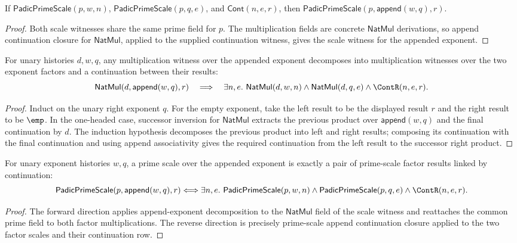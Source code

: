 \begin{theorem}
\label{thm:padic-prime-scale-append-cont-closure}
If \(\mathsf{PadicPrimeScale}(p,w,n)\), \(\mathsf{PadicPrimeScale}(p,q,e)\),
and \(\mathsf{Cont}(n,e,r)\), then
\(\mathsf{PadicPrimeScale}(p,\mathsf{append}(w,q),r)\).
\end{theorem}
\begin{proof}
Both scale witnesses share the same prime field for \(p\). The multiplication
fields are concrete \(\mathsf{NatMul}\) derivations, so append continuation
closure for \(\mathsf{NatMul}\), applied to the supplied continuation witness,
gives the scale witness for the appended exponent.
\end{proof}

\begin{theorem}
\label{thm:padic-natmul-append-exponent-decomposition}
For unary histories $d,w,q$, any multiplication witness over the appended
exponent decomposes into multiplication witnesses over the two exponent
factors and a continuation between their results:
$$
\mathsf{NatMul}(d,\mathsf{append}(w,q),r)
\quad\Longrightarrow\quad
\exists n,e.\ \mathsf{NatMul}(d,w,n)\land
\mathsf{NatMul}(d,q,e)\land\ContR(n,e,r).
$$
\end{theorem}
\begin{proof}
Induct on the unary right exponent $q$. For the empty exponent, take the left
result to be the displayed result $r$ and the right result to be $\emp$. In the
one-headed case, successor inversion for $\mathsf{NatMul}$ extracts the
previous product over $\mathsf{append}(w,q)$ and the final continuation by
$d$. The induction hypothesis decomposes the previous product into left and
right results; composing its continuation with the final continuation and
using append associativity gives the required continuation from the left
result to the successor right product.
\end{proof}

\begin{theorem}
\label{thm:padic-prime-scale-append-factorization}
For unary exponent histories $w,q$, a prime scale over the appended exponent
is exactly a pair of prime-scale factor results linked by continuation:
$$
\mathsf{PadicPrimeScale}(p,\mathsf{append}(w,q),r)
\Longleftrightarrow
\exists n,e.\ \mathsf{PadicPrimeScale}(p,w,n)\land
\mathsf{PadicPrimeScale}(p,q,e)\land\ContR(n,e,r).
$$
\end{theorem}
\begin{proof}
The forward direction applies append-exponent decomposition to the
$\mathsf{NatMul}$ field of the scale witness and reattaches the common prime
field to both factor multiplications. The reverse direction is precisely
prime-scale append continuation closure applied to the two factor scales and
their continuation row.
\end{proof}

